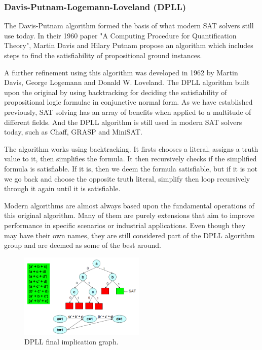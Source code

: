 \documentclass{article}
\begin{document}
    \subsubsection{Davis-Putnam-Logemann-Loveland (DPLL)}
    The Davis-Putnam algorithm formed the basis of what modern SAT solvers still use today. In their 1960 paper "A Computing Procedure for
    Quantification Theory"\cite{putnam}, Martin Davis and Hilary Putnam propose an algorithm which includes steps to find the satisfiability of
    propositional ground instances.

    A further refinement using this algorithm was developed in 1962 by Martin Davis, George Logemann and Donald W. Loveland. The
    DPLL algorithm built upon the original by using backtracking for deciding the satisfiability of propositional logic formulae in
    conjunctive normal form\cite{dpll}. As we have established previously, SAT solving has an array of benefits when applied to a multitude of
    different fields. And the DPLL algorithm is still used in modern SAT solvers today, such as Chaff, GRASP and MiniSAT.

    The algorithm works using backtracking. It firsts chooses a literal, assigns a truth value to it, then simplifies the formula. It then
    recursively checks if the simplified formula is satisfiable. If it is, then we deem the formula satisfiable, but if it is not we go back
    and choose the opposite truth literal, simplify then loop recursively through it again until it is satisfiable.

    Modern algorithms are almost always based upon the fundamental operations of this original algorithm. Many of them are purely extensions
    that aim to improve performance in specific scenarios or industrial applications. Even though they may have their own names, they are
    still considered part of the DPLL algorithm group and are deemed as some of the best around.

    \begin{figure}[h]
        \caption{DPLL final implication graph. \cite{dpllgraph}}
        \includegraphics[width=6cm]{Dpll11.png}
        \centering
    \end{figure}
\end{document}
